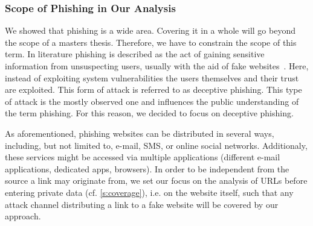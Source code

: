 \subsubsection{Scope of Phishing in Our Analysis}
\label{s:scope}
We showed that phishing is a wide area. 
Covering it in a whole will go beyond the scope of a masters thesis. 
Therefore, we have to constrain the scope of this term.
 In literature phishing is described as the act of gaining sensitive information from unsuspecting users, usually with the aid of fake websites~\cite{sheng2007antiphishingphil, antiphishingtrendreport2013, kasperskyreport2013}.
Here, instead of exploiting system vulnerabilities the users themselves and their trust are exploited.
This form of attack is referred to as deceptive phishing.
This type of attack is the mostly observed one and influences the public understanding of the term phishing.
 For this reason, we decided to focus on deceptive phishing.
 
 As aforementioned, phishing websites can be distributed in several ways, including, but not limited to, e-mail, SMS, or online social networks.
 Additionaly, these services might be accessed via multiple applications (different e-mail applications, dedicated apps, browsers).
 In order to be independent from the source a link may originate from, we set our focus on the analysis of URLs before entering private data (cf. \autoref{s:coverage}), i.e. on the website itself, such that any attack channel distributing a link to a fake website will be covered by our approach.
 
